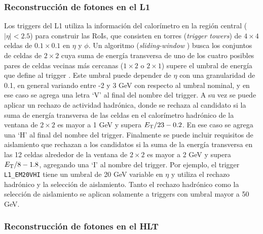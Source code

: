 \subsubsection{Reconstrucción de fotones en el L1}

Los triggers del L1 
 \commentNotaII 
utiliza la información del calorímetro en la región central ($|\eta|<2.5$) para construir las RoIs, que consisten en torres (\textit{trigger towers}) de $4\times4$ celdas de $0.1\times0.1$ en $\eta$ y $\phi$. Un algoritmo (\textit{sliding-window} \cite{Lampl:1099735}) busca los conjuntos de celdas de $2\times2$ cuya suma de energía transversa de uno de los cuatro posibles pares de celdas vecinas más cercanas ($1\times2$ o $2\times1$) supere el umbral de energía que define al trigger 
 . 
Este umbral puede depender de $\eta$ con una granularidad de 0.1, en general variando entre -2 y 3 GeV con respecto al umbral nominal, y en ese caso se agrega una letra `V' al final del nombre del trigger. A su vez se puede aplicar un rechazo de actividad hadrónica, donde se rechaza al candidato si la suma de energía transversa de las celdas en el calorímetro hadrónico de la ventana de $2\times2$ es mayor a 1 GeV y supera $E_{\text{T}}/23-0.2$. En ese caso se agrega una `H' al final del nombre del trigger. Finalmente se puede incluir requisitos de aislamiento que rechazan a los candidatos si la suma de la energía transversa en las 12 celdas alrededor de la ventana de $2\times2$ es mayor a 2 GeV y supera $E_{\text{T}}/8-1.8$, agregando una `I' al nombre del trigger. Por ejemplo, el trigger \texttt{L1\_EM20VHI} tiene un umbral de 20 GeV variable en $\eta$ y utiliza el rechazo hadrónico y la selección de aislamiento. Tanto el rechazo hadrónico como la selección de aislamiento se aplican solamente a triggers con umbral mayor a 50 GeV.

\subsubsection{Reconstrucción de fotones en el HLT}

